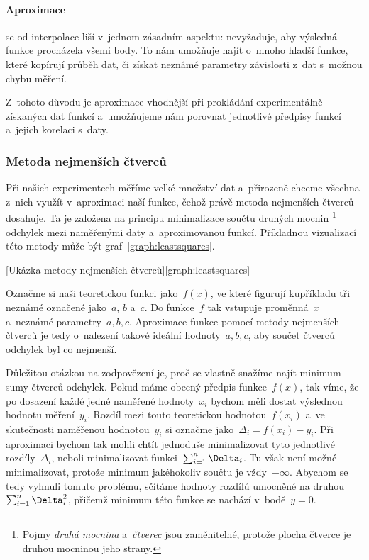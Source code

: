 \paragraph{Aproximace} se od interpolace liší v~jednom zásadním aspektu:
nevyžaduje, aby výsledná funkce procházela všemi body. To nám umožňuje najít
o~mnoho hladší funkce, které kopírují průběh dat, či získat neznámé parametry
závislosti z~dat s~možnou chybu měření. 

Z~tohoto důvodu je aproximace vhodnější při prokládání experimentálně získaných
dat funkcí a~umožňujeme nám porovnat jednotlivé předpisy funkcí a~jejich
korelaci s~daty.

\subsubsection{Metoda nejmenších čtverců}
\label{sec:čtverce}
Při našich experimentech měříme velké množství dat a~přirozeně chceme všechna
z~nich využít v~aproximaci naší funkce, čehož právě metoda nejmenších čtverců
dosahuje. Ta je založena na principu minimalizace součtu druhých mocnin%
\footnote{Pojmy \emph{druhá mocnina} a~\emph{čtverec} jsou zaměnitelné, protože
plocha čtverce je druhou mocninou jeho strany.} odchylek mezi naměřenými daty
a~aproximovanou funkcí. Příkladnou vizualizací této metody může být
graf~\ref{graph:leastsquares}.

[Ukázka metody nejmenších čtverců][graph:leastsquares]

Označme si naši teoretickou funkci  jako~$f(x)$, ve které figurují kupříkladu
tři neznámé označené  jako~$a$, $b$ a~$c$. Do funkce~$f$ tak vstupuje
proměnná~$x$ a~neznámé parametry~$a,b,c$. Aproximace funkce pomocí metody
nejmenších čtverců je tedy o~nalezení takové ideální hodnoty~$a,b,c$,
aby součet čtverců odchylek byl co nejmenší.

Důležitou otázkou na zodpovězení je, proč se vlastně snažíme najít minimum sumy
čtverců odchylek. Pokud máme obecný předpis funkce~$f(x)$, tak víme, že po
dosazení každé jedné naměřené hodnoty~$x_i$ bychom měli dostat výslednou
hodnotu měření~$y_i$. Rozdíl mezi touto teoretickou hodnotou~$f(x_i)$ a~ve
skutečnosti naměřenou hodnotou~$y_i$ si označme jako~$\Delta_i = f(x_i)-y_i$.
Při aproximaci bychom tak mohli chtít jednoduše minimalizovat tyto jednotlivé
rozdíly~$\Delta_i$, neboli minimalizovat funkci~$\nsum \Delta_i$. Tu však není
možné minimalizovat, protože minimum jakéhokoliv součtu je vždy~$-\infty$.
Abychom se tedy vyhnuli tomuto problému, sčítáme hodnoty rozdílů umocněné na
druhou~$\nsum \Delta_i^2$, přičemž minimum této funkce se nachází
v~bodě~$y=0$.~\cite{praktikum}

